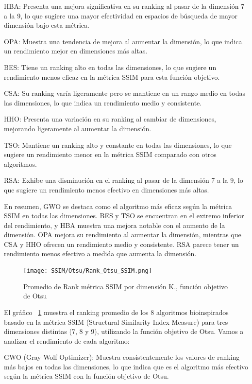 \documentclass[conference]{IEEEtran}
\begin{document}
\noindent HBA: Presenta una mejora significativa en su ranking al pasar de la dimensión 7 a la 9, lo que sugiere una mayor efectividad en espacios de búsqueda de mayor dimensión bajo esta métrica.

\noindent OPA: Muestra una tendencia de mejora al aumentar la dimensión, lo que indica un rendimiento mejor en dimensiones más altas.

\noindent BES: Tiene un ranking alto en todas las dimensiones, lo que sugiere un rendimiento menos eficaz en la métrica SSIM para esta función objetivo.

\noindent CSA: Su ranking varía ligeramente pero se mantiene en un rango medio en todas las dimensiones, lo que indica un rendimiento medio y consistente.

\noindent HHO: Presenta una variación en su ranking al cambiar de dimensiones, mejorando ligeramente al aumentar la dimensión.

\noindent TSO: Mantiene un ranking alto y constante en todas las dimensiones, lo que sugiere un rendimiento menor en la métrica SSIM comparado con otros algoritmos.

\noindent RSA: Exhibe una disminución en el ranking al pasar de la dimensión 7 a la 9, lo que sugiere un rendimiento menos efectivo en dimensiones más altas.

\noindent En resumen, GWO se destaca como el algoritmo más eficaz según la métrica SSIM en todas las dimensiones. BES y TSO se encuentran en el extremo inferior del rendimiento, y HBA muestra una mejora notable con el aumento de la dimensión. OPA mejora su rendimiento al aumentar la dimensión, mientras que CSA y HHO ofrecen un rendimiento medio y consistente. RSA parece tener un rendimiento menos efectivo a medida que aumenta la dimensión.

\begin{figure}[!htb]
	\centering
	\texttt{[image: SSIM/Otsu/Rank\_Otsu\_SSIM.png]}
	\caption{Promedio de Rank métrica SSIM por dimensión K., función objetivo de Otsu}
	\label{fig:SSIM_Otsu_Rank}
\end{figure}
\noindent El gráfico ~\ref{fig:SSIM_Otsu_Rank} muestra el ranking promedio de los 8 algoritmos bioinspirados basado en la métrica SSIM (Structural Similarity Index Measure) para tres dimensiones distintas (7, 8 y 9), utilizando la función objetivo de Otsu. Vamos a analizar el rendimiento de cada algoritmo:

\noindent GWO (Gray Wolf Optimizer): Muestra consistentemente los valores de ranking más bajos en todas las dimensiones, lo que indica que es el algoritmo más efectivo según la métrica SSIM con la función objetivo de Otsu.
\end{document}
